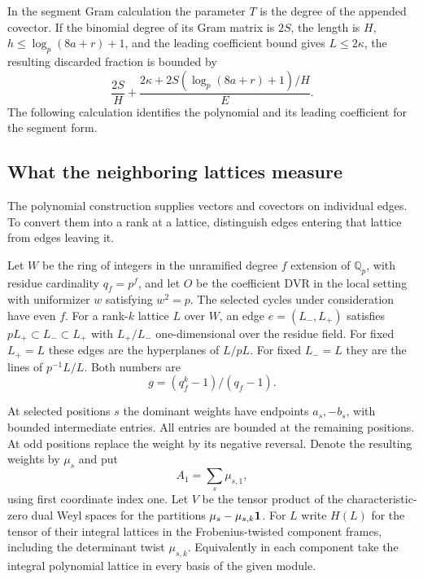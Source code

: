 In the segment Gram calculation the
parameter \(T\) is the degree of the appended covector. If the
binomial degree of its Gram matrix is \(2S\), the length
is \(H\), \(h\le\log_p(8a+r)+1\), and the leading coefficient
bound gives \(L\le2\kappa\), the resulting discarded fraction
is bounded by
\[
 \frac{2S}{H}+
 \frac{2\kappa+2S(\log_p(8a+r)+1)/H}{E}.
\] The following calculation identifies the polynomial and
its leading coefficient for the segment form.










\subsection{What the neighboring lattices measure}

The polynomial construction supplies vectors and covectors on individual edges. To convert them into a rank at a lattice, distinguish edges entering that lattice from edges leaving it.

Let \(W\) be the ring of integers in the unramified degree
\(f\) extension of \(\mathbb Q_p\), with residue cardinality
\(q_f=p^f\), and let \(O\) be the coefficient DVR in the local
setting with uniformizer \(w\) satisfying \(w^2=p\).
The selected cycles under consideration have even \(f\).
For a rank-\(k\) lattice \(L\) over \(W\), an edge
\(e=(L_-,L_+)\) satisfies \(pL_+\subset L_-\subset L_+\)
with \(L_+/L_-\) one-dimensional over the residue field.
For fixed \(L_+=L\) these edges are the hyperplanes of \(L/pL\).
For fixed \(L_-=L\) they are the lines of \(p^{-1}L/L\).
Both numbers are
\[
                       g=(q_f^k-1)/(q_f-1).
\]

At selected positions \(s\) the dominant weights have endpoints
\(a_s,-b_s\), with bounded intermediate entries. All entries
are bounded at the remaining positions. At odd positions replace
the weight by its negative reversal. Denote the resulting weights
by \(\mu_s\) and put
\[
 A_1=\sum_s\mu_{s,1},
\]
using first
coordinate index one. Let \(V\) be the tensor product of the
characteristic-zero dual Weyl spaces for the partitions
\(\mu_s-\mu_{s,k}{\bf1}\). For \(L\) write \(H(L)\) for the
tensor of their integral lattices in the Frobenius-twisted
component frames, including the determinant twist \(\mu_{s,k}\).
Equivalently in each component take the integral polynomial
lattice in every basis of the given module.

